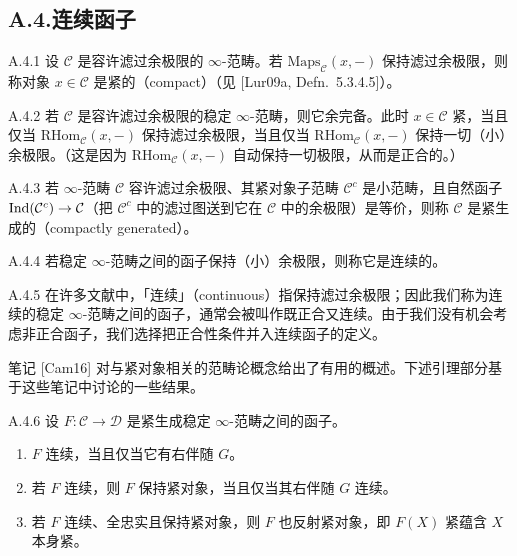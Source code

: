 \subsection*{A.4.\quad 连续函子}

\begin{defn}{A.4.1}\label{defn:a4-17-A-4-1}
设 $\mathcal C$ 是容许滤过余极限的 $\infty$-范畴。若 $\mathrm{Maps}_{\mathcal C}(x,-)$ 保持滤过余极限，则称对象 $x\in\mathcal C$ 是紧的（compact）（见 [Lur09a, Defn.~5.3.4.5]）。
\end{defn}

\begin{rem}{A.4.2}\label{rem:a4-17-A-4-2}
若 $\mathcal C$ 是容许滤过余极限的稳定 $\infty$-范畴，则它余完备。此时 $x\in\mathcal C$ 紧，当且仅当 $\mathrm{RHom}_{\mathcal C}(x,-)$ 保持滤过余极限，当且仅当 $\mathrm{RHom}_{\mathcal C}(x,-)$ 保持一切（小）余极限。（这是因为 $\mathrm{RHom}_{\mathcal C}(x,-)$ 自动保持一切极限，从而是正合的。）
\end{rem}

\begin{defn}{A.4.3}\label{defn:a4-17-A-4-3}
若 $\infty$-范畴 $\mathcal C$ 容许滤过余极限、其紧对象子范畴 $\mathcal C^c$ 是小范畴，且自然函子 $\operatorname{Ind}(\mathcal C^c)\to\mathcal C$（把 $\mathcal C^c$ 中的滤过图送到它在 $\mathcal C$ 中的余极限）是等价，则称 $\mathcal C$ 是紧生成的（compactly generated）。
\end{defn}

\begin{defn}{A.4.4}\label{defn:a4-17-A-4-4}
若稳定 $\infty$-范畴之间的函子保持（小）余极限，则称它是连续的。
\end{defn}

\begin{rem}{A.4.5}\label{rem:a4-17-A-4-5}
在许多文献中，「连续」（continuous）指保持滤过余极限；因此我们称为连续的稳定 $\infty$-范畴之间的函子，通常会被叫作既正合又连续。由于我们没有机会考虑非正合函子，我们选择把正合性条件并入连续函子的定义。
\end{rem}

笔记 [Cam16] 对与紧对象相关的范畴论概念给出了有用的概述。下述引理部分基于这些笔记中讨论的一些结果。

\begin{lem}{A.4.6}\label{lem:a4-17-A-4-6}
设 $F:\mathcal C\to\mathcal D$ 是紧生成稳定 $\infty$-范畴之间的函子。
\begin{enumerate}[label=(\arabic*)]
\item $F$ 连续，当且仅当它有右伴随 $G$。
\item 若 $F$ 连续，则 $F$ 保持紧对象，当且仅当其右伴随 $G$ 连续。
\item 若 $F$ 连续、全忠实且保持紧对象，则 $F$ 也反射紧对象，即 $F(X)$ 紧蕴含 $X$ 本身紧。
\end{enumerate}
\end{lem}

